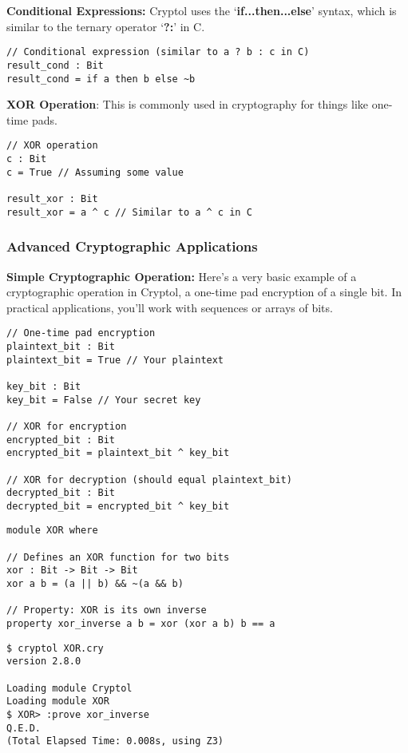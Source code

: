 \textbf{Conditional Expressions:} Cryptol uses the `\textbf{if...then...else}' syntax, which is similar to the ternary operator `\textbf{?:}' in C.

\begin{lstlisting}[style=cryptol]
// Conditional expression (similar to a ? b : c in C)
result_cond : Bit
result_cond = if a then b else ~b
\end{lstlisting}

\textbf{XOR Operation}: This is commonly used in cryptography for things like one-time pads.

\begin{lstlisting}[style=cryptol]
// XOR operation
c : Bit
c = True // Assuming some value

result_xor : Bit
result_xor = a ^ c // Similar to a ^ c in C
\end{lstlisting}

\subsubsection{Advanced Cryptographic Applications}
\textbf{Simple Cryptographic Operation:} Here’s a very basic example of a cryptographic operation in Cryptol, a one-time pad encryption of a single bit. In practical applications, you'll work with sequences or arrays of bits.

\begin{lstlisting}[style=cryptol]
// One-time pad encryption
plaintext_bit : Bit
plaintext_bit = True // Your plaintext

key_bit : Bit
key_bit = False // Your secret key

// XOR for encryption
encrypted_bit : Bit
encrypted_bit = plaintext_bit ^ key_bit

// XOR for decryption (should equal plaintext_bit)
decrypted_bit : Bit
decrypted_bit = encrypted_bit ^ key_bit           
\end{lstlisting}

\begin{lstlisting}[style=cryptol]
module XOR where

// Defines an XOR function for two bits
xor : Bit -> Bit -> Bit
xor a b = (a || b) && ~(a && b)

// Property: XOR is its own inverse
property xor_inverse a b = xor (xor a b) b == a
\end{lstlisting}
\begin{lstlisting}[style=zsh]
$ cryptol XOR.cry
version 2.8.0

Loading module Cryptol
Loading module XOR
$ XOR> :prove xor_inverse
Q.E.D.
(Total Elapsed Time: 0.008s, using Z3)
\end{lstlisting}

